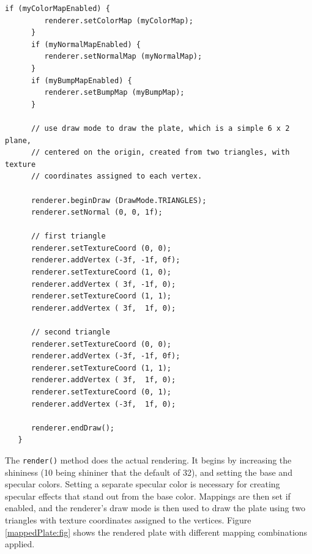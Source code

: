\begin{lstlisting}[caption={Rendering code to set up color, normal and
bump maps.},
label=renderMapping:lst]
      if (myColorMapEnabled) {
         renderer.setColorMap (myColorMap);
      }
      if (myNormalMapEnabled) {
         renderer.setNormalMap (myNormalMap);
      }
      if (myBumpMapEnabled) {
         renderer.setBumpMap (myBumpMap); 
      }

      // use draw mode to draw the plate, which is a simple 6 x 2 plane,
      // centered on the origin, created from two triangles, with texture
      // coordinates assigned to each vertex.

      renderer.beginDraw (DrawMode.TRIANGLES);
      renderer.setNormal (0, 0, 1f);

      // first triangle
      renderer.setTextureCoord (0, 0);
      renderer.addVertex (-3f, -1f, 0f);
      renderer.setTextureCoord (1, 0);
      renderer.addVertex ( 3f, -1f, 0);
      renderer.setTextureCoord (1, 1);
      renderer.addVertex ( 3f,  1f, 0);

      // second triangle
      renderer.setTextureCoord (0, 0);
      renderer.addVertex (-3f, -1f, 0f);
      renderer.setTextureCoord (1, 1);
      renderer.addVertex ( 3f,  1f, 0);
      renderer.setTextureCoord (0, 1);
      renderer.addVertex (-3f,  1f, 0);

      renderer.endDraw(); 
   }
\end{lstlisting}
%
The {\tt render()} method does the actual rendering.  It begins by
increasing the shininess (10 being shininer that the default of 32),
and setting the base and specular colors.  Setting a separate specular
color is necessary for creating specular effects that stand out from
the base color. Mappings are then set if enabled, and the
renderer's draw mode is then used to draw the plate using two triangles
with texture coordinates assigned to the vertices. Figure
\ref{mappedPlate:fig} shows the rendered plate with different mapping
combinations applied.

